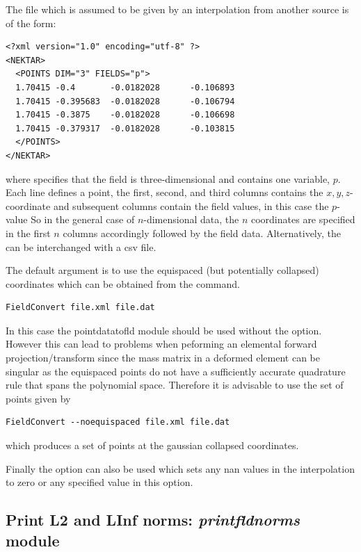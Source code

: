 The file  which is assumed to be given by an interpolation from another source is of the form:
%
\begin{lstlisting}[style=XMLStyle]
<?xml version="1.0" encoding="utf-8" ?>
<NEKTAR>
  <POINTS DIM="3" FIELDS="p">
  1.70415 -0.4       -0.0182028      -0.106893
  1.70415 -0.395683  -0.0182028      -0.106794
  1.70415 -0.3875    -0.0182028      -0.106698
  1.70415 -0.379317  -0.0182028      -0.103815
  </POINTS>
</NEKTAR>
\end{lstlisting}
%
where  specifies that the field is
three-dimensional and contains one variable, $p$. Each line defines a
point, the first, second, and third columns contains the
$x,y,z$-coordinate and subsequent columns contain the field values, in
this case the $p$-value So in the general case of $n$-dimensional
data, the $n$ coordinates are specified in the first $n$ columns
accordingly followed by the field data. Alternatively, the 
can be interchanged with a csv file.

The default argument is to use the equispaced (but potentially
collapsed) coordinates which can  be obtained from the command.

\begin{lstlisting}[style=BashInputStyle]
FieldConvert file.xml file.dat
\end{lstlisting}

In this case the pointdatatofld module should be used without the
 option. However this can lead to problems when
peforming an elemental forward projection/transform since the mass
matrix in a deformed element can be singular as the equispaced points
do not have a sufficiently accurate quadrature rule that spans the
polynomial space. Therefore it is advisable to use the set of points
given by

\begin{lstlisting}[style=BashInputStyle]
FieldConvert --noequispaced file.xml file.dat
\end{lstlisting}

which produces a set of points at the gaussian collapsed
coordinates.

Finally the option  can also be used which sets
any nan values in the interpolation to zero or any specified value in
this option.

%
%
%

\subsection{Print L2 and LInf norms: \textit{printfldnorms} module}

